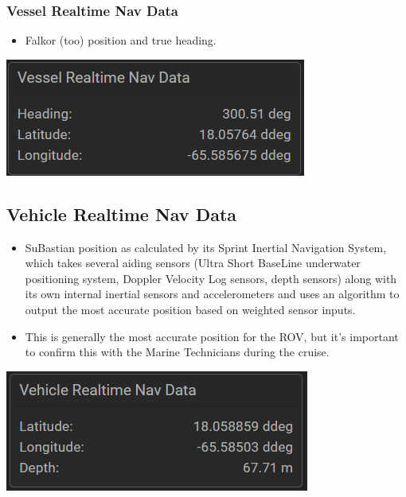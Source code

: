 \documentclass[
  letterpaper,
  DIV=11,
  numbers=noendperiod]{scrreprt}
\providecommand{\tightlist}{%
  \setlength{\itemsep}{0pt}\setlength{\parskip}{0pt}}\usepackage{longtable,booktabs,array}
\begin{document}
\hypertarget{vessel-realtime-nav-data}{%
\subsubsection{Vessel Realtime Nav
Data}\label{vessel-realtime-nav-data}}

\begin{itemize}
\tightlist
\item
  Falkor (too) position and true heading.
\end{itemize}

\includegraphics{images/image2.png}

\hypertarget{vehicle-realtime-nav-data}{%
\subsection{Vehicle Realtime Nav Data}\label{vehicle-realtime-nav-data}}

\begin{itemize}
\tightlist
\item
  SuBastian position as calculated by its Sprint Inertial Navigation
  System, which takes several aiding sensors (Ultra Short BaseLine
  underwater positioning system, Doppler Velocity Log sensors, depth
  sensors) along with its own internal inertial sensors and
  accelerometers and uses an algorithm to output the most accurate
  position based on weighted sensor inputs.
\item
  This is generally the most accurate position for the ROV, but it's
  important to confirm this with the Marine Technicians during the
  cruise.
\end{itemize}

\includegraphics{images/image17.png}
\end{document}
